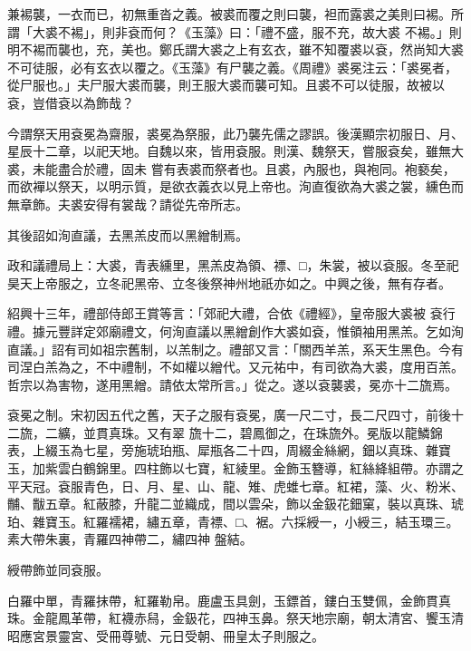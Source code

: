 \begin{pinyinscope}
 兼裼襲，一衣而已，初無重沓之義。被裘而覆之則曰襲，袒而露裘之美則曰裼。所謂「大裘不裼」，則非袞而何？《玉藻》曰：「禮不盛，服不充，故大裘
 不裼。」則明不裼而襲也，充，美也。鄭氏謂大裘之上有玄衣，雖不知覆裘以袞，然尚知大裘不可徒服，必有玄衣以覆之。《玉藻》有尸襲之義。《周禮》裘冕注云：「裘冕者，從尸服也。」夫尸服大裘而襲，則王服大裘而襲可知。且裘不可以徒服，故被以袞，豈借袞以為飾哉？



 今謂祭天用袞冕為齋服，裘冕為祭服，此乃襲先儒之謬誤。後漢顯宗初服日、月、星辰十二章，以祀天地。自魏以來，皆用袞服。則漢、魏祭天，嘗服袞矣，雖無大裘，未能盡合於禮，固未
 嘗有表裘而祭者也。且裘，內服也，與袍同。袍褻矣，而欲襌以祭天，以明示質，是欲衣義衣以見上帝也。洵直復欲為大裘之裳，纁色而無章飾。夫裘安得有裳哉？請從先帝所志。



 其後詔如洵直議，去黑羔皮而以黑繒制焉。



 政和議禮局上：大裘，青表纁里，黑羔皮為領、褾、□，朱裳，被以袞服。冬至祀昊天上帝服之，立冬祀黑帝、立冬後祭神州地祇亦如之。中興之後，無有存者。



 紹興十三年，禮部侍郎王賞等言：「郊祀大禮，合依《禮經》，皇帝服大裘被
 袞行禮。據元豐詳定郊廟禮文，何洵直議以黑繒創作大裘如袞，惟領袖用黑羔。乞如洵直議。」詔有司如祖宗舊制，以羔制之。禮部又言：「關西羊羔，系天生黑色。今有司涅白羔為之，不中禮制，不如權以繒代。又元祐中，有司欲為大裘，度用百羔。哲宗以為害物，遂用黑繒。請依太常所言。」從之。遂以袞襲裘，冕亦十二旒焉。



 袞冕之制。宋初因五代之舊，天子之服有袞冕，廣一尺二寸，長二尺四寸，前後十二旒，二纊，並貫真珠。又有翠
 旒十二，碧鳳御之，在珠旒外。冕版以龍鱗錦表，上綴玉為七星，旁施琥珀瓶、犀瓶各二十四，周綴金絲網，鈿以真珠、雜寶玉，加紫雲白鶴錦里。四柱飾以七寶，紅綾里。金飾玉簪導，紅絲絳組帶。亦謂之平天冠。袞服青色，日、月、星、山、龍、雉、虎蜼七章。紅裙，藻、火、粉米、黼、黻五章。紅蔽膝，升龍二並織成，間以雲朵，飾以金鈒花鈿窠，裝以真珠、琥珀、雜寶玉。紅羅襦裙，繡五章，青褾、□、裾。六採綬一，小綬三，結玉環三。素大帶朱裏，青羅四神帶二，繡四神
 盤結。



 綬帶飾並同袞服。



 白羅中單，青羅抹帶，紅羅勒帛。鹿盧玉具劍，玉鏢首，鏤白玉雙佩，金飾貫真珠。金龍鳳革帶，紅襪赤舄，金鈒花，四神玉鼻。祭天地宗廟，朝太清宮、饗玉清昭應宮景靈宮、受冊尊號、元日受朝、冊皇太子則服之。




\end{pinyinscope}
